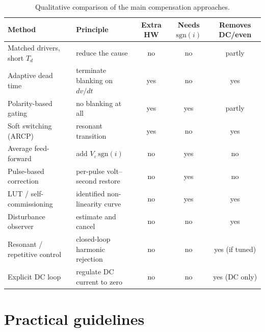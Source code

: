 \documentclass[11pt,a4paper]{article}
\begin{document}
\begin{table}[htb]
\centering
\caption{Qualitative comparison of the main compensation approaches.}
\label{tab:comparison}
\small
\begin{tabularx}{\textwidth}{@{}lXccc@{}}
\toprule
Method & Principle & Extra HW & Needs $\mathrm{sgn}(i)$ & Removes DC/even \\
\midrule
Matched drivers, short $T_d$ & reduce the cause & no & no & partly \\
Adaptive dead time & terminate blanking on $dv/dt$ & yes & no & yes \\
Polarity-based gating & no blanking at all & yes & yes & partly \\
Soft switching (ARCP) & resonant transition & yes & no & yes \\
Average feed-forward & add $V_{\!\varepsilon}\,\mathrm{sgn}(i)$ & no & yes & no \\
Pulse-based correction & per-pulse volt--second restore & no & yes & no \\
LUT / self-commissioning & identified non-linearity curve & no & yes & yes \\
Disturbance observer & estimate and cancel & no & no & yes \\
Resonant / repetitive control & closed-loop harmonic rejection & no & no & yes (if tuned) \\
Explicit DC loop & regulate DC current to zero & no & no & yes (DC only) \\
\bottomrule
\end{tabularx}
\end{table}

\section{Practical guidelines}
\end{document}
